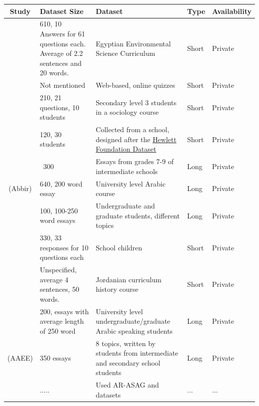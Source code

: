 \documentclass{article}
\begin{document}
	\begin{table}
		\centering
		\begin{tabularx}{7in}{|c|X|p{1.5in}|p{1cm}|p{1.5cm}|}
			\hline
			Study & Dataset Size & Dataset & Type & Availability \\ \hline
			\textcite{1_gomaa2014arabic} & 610, 10 Answers for 61 questions each.  Average of 2.2 sentences and 20 words. & Egyptian Environmental Science Curriculum & Short & Private \\ \hline
			\textcite{2_shalabi2016levenshtein} & Not mentioned & Web-based, online quizzes & Short & Private \footnotemark[1] \\ \hline
			\textcite{3_shehab2018arabicsimiliarity} & 210, 21 questions, 10 students & Secondary level 3 students in a sociology course & Short & Private \\ \hline
			\textcite{4_abdeljaber2021wordnet} & 120, 30 students & Collected from a school, designed after the \href{https://www.kaggle.com/c/asap-aes}{Hewlett Foundation Dataset} & Short & Private \\ \hline
			\textcite{5_aljouie2017schoolchildren} & ~300 & Essays from grades 7-9 of intermediate schools & Long & Private \\ \hline
			\textcite{6_ghamdi2014hybridarabic} (Abbir) & 640, 200 word essay & University level Arabic course & Long & Private \\ \hline
			\textcite{7_qahtani2019rulebased} & 100, 100-250 word essays & Undergraduate and graduate students, different topics & Long & Private \\ \hline
			\textcite{8_abdel2021lcs} & 330, 33 responses for 10 questions each & School children & Short & Private \footnotemark[2] \\ \hline
			\textcite{16_rababah2017short} & Unspecified, average 4 sentences, 50 words. & Jordanian curriculum history course & Short & Private \\ \hline
			\textcite{18_alqahtani2020svr} & 200, essays with average length of 250 word & University level undergraduate/graduate Arabic speaking students & Long & Private \\ \hline
			\textcite{20_azmi2019aaee} (AAEE) & 350 essays & 8 topics, written by students from intermediate and secondary school students & Long & Private \\ \hline
			\textcite{22_meccawy2023mining} & ..... & Used AR-ASAG \cite{ouahrani2020ar-asag} and \textcite{16_rababah2017short} datasets & ... & ... \\ \hline

\end{tabularx}
\end{table}
\end{document}
